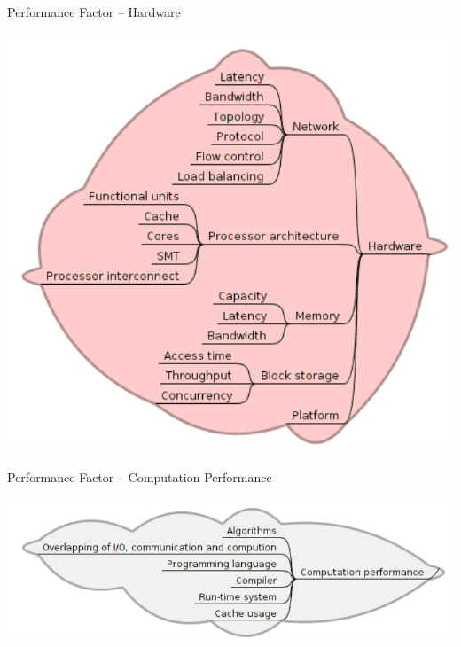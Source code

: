 \documentclass[compress,11pt,xcolor=svgnames,aspectratio=169]{beamer}
\begin{document}
\begin{frame}[t]{Performance Factor -- Hardware}

\begin{center}
\includegraphics[scale=0.4]{fig/tree-hard}
\end{center}

\nocite{SOPPOAASLK13}

\end{frame}

\begin{frame}[t]{Performance Factor -- Computation Performance}

\begin{center}
\includegraphics[scale=0.4]{fig/tree-comp-perf}
\end{center}

\nocite{SOPPOAASLK13}

\end{frame}
\end{document}
